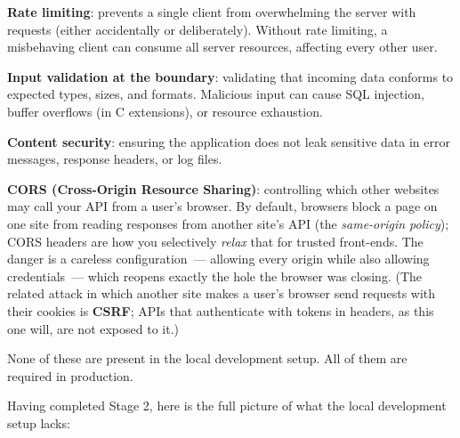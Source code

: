 \textbf{Rate limiting}: prevents a single client from overwhelming the server with requests (either accidentally or deliberately). Without rate limiting, a misbehaving client can consume all server resources, affecting every other user.

\textbf{Input validation at the boundary}: validating that incoming data conforms to expected types, sizes, and formats. Malicious input can cause SQL injection, buffer overflows (in C extensions), or resource exhaustion.

\textbf{Content security}: ensuring the application does not leak sensitive data in error messages, response headers, or log files.

\textbf{CORS (Cross-Origin Resource Sharing)}: controlling which other websites may call your API from a user's browser. By default, browsers block a page on one site from reading responses from another site's API (the \emph{same-origin policy}); CORS headers are how you selectively \emph{relax} that for trusted front-ends. The danger is a careless configuration~--- allowing every origin while also allowing credentials~--- which reopens exactly the hole the browser was closing. (The related attack in which another site makes a user's browser send requests with their cookies is \textbf{CSRF}; APIs that authenticate with tokens in headers, as this one will, are not exposed to it.)

None of these are present in the local development setup. All of them are required in production.

\label{11-reliability-security-gaps:stage-2-summary-the-complete-picture-of-local-limitations}

Having completed Stage 2, here is the full picture of what the local development setup lacks:

